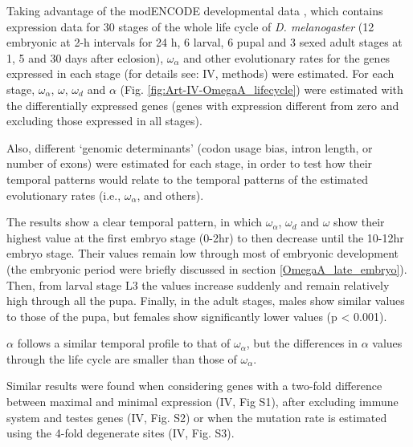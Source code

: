 Taking advantage of the modENCODE developmental data \citep{Graveley2011}, which contains expression data for 30 stages of the whole life cycle of \textit{D. melanogaster} (12 embryonic at 2-h intervals for 24 h, 6 larval, 6 pupal and 3 sexed adult stages at 1, 5 and 30 days after eclosion), $\omega_{\alpha}$ and other evolutionary rates for the genes expressed in each stage (for details see: IV, methods) were estimated.
For each stage, $\omega_{\alpha}$, $\omega$, $\omega_{d}$ and $\alpha$ (Fig. \ref{fig:Art-IV-OmegaA_lifecycle}) were estimated with the differentially expressed genes (genes with expression different from zero and excluding those expressed in all stages).

Also, different `genomic determinants' (codon usage bias, intron length, or number of exons) were estimated for each stage, in order to test how their temporal patterns would relate to the temporal patterns of the estimated evolutionary rates (i.e., $\omega_{\alpha}$, and others).




The results show a clear temporal pattern, in which $\omega_{\alpha}$, $\omega_{d}$ and $\omega$ show their highest value at the first embryo stage (0-2hr) to then decrease until the 10-12hr embryo stage.
Their values remain low through most of embryonic development (the embryonic period were briefly discussed in section \ref{OmegaA_late_embryo}).
Then, from larval stage L3 the values increase suddenly and remain relatively high through all the pupa. 
Finally, in the adult stages, males show similar values to those of the pupa, but females show significantly lower values (p < 0.001). 

$\alpha$ follows a similar temporal profile to that of $\omega_{\alpha}$, but the differences in $\alpha$ values through the life cycle are smaller than those of $\omega_{\alpha}$.

Similar results were found when considering genes with a two-fold difference between maximal and minimal expression (IV, Fig S1), after excluding immune system and testes genes (IV, Fig. S2) or when the mutation rate is estimated using the 4-fold degenerate sites (IV, Fig. S3).

